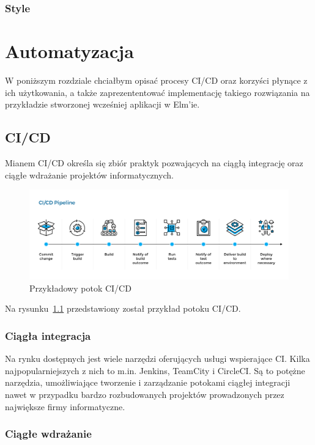 \documentclass[twoside,a4paper]{report}
\begin{document}
\subsection{Style}


\chapter{Automatyzacja}
W poniższym rozdziale chciałbym opisać procesy CI/CD oraz korzyści płynące z ich użytkowania, a także zaprezententować implementację takiego rozwiązania na przykładzie stworzonej wcześniej aplikacji w Elm'ie.

\section{CI/CD}
Mianem CI/CD określa się zbiór praktyk pozwających na ciągłą integrację oraz ciągłe wdrażanie projektów informatycznych.
\begin{figure}[H]
    \centering
    \includegraphics[width=1\textwidth]{cicd_pipeline.png}
    \caption{Przykładowy potok CI/CD}\label{fig:cicd_pipeline}
\end{figure}
Na rysunku~\ref{fig:cicd_pipeline} przedstawiony został przykład potoku CI/CD\@.

\subsection{Ciągła integracja}

Na rynku dostępnych jest wiele narzędzi oferujących usługi wspierające CI\@. Kilka najpopularniejszych z nich to m.in. Jenkins, TeamCity i CircleCI\@.
Są to potężne narzędzia, umożliwiające tworzenie i zarządzanie potokami ciągłej integracji nawet w przypadku bardzo rozbudowanych projektów prowadzonych przez największe firmy informatyczne.
\subsection{Ciągłe wdrażanie}
\end{document}
